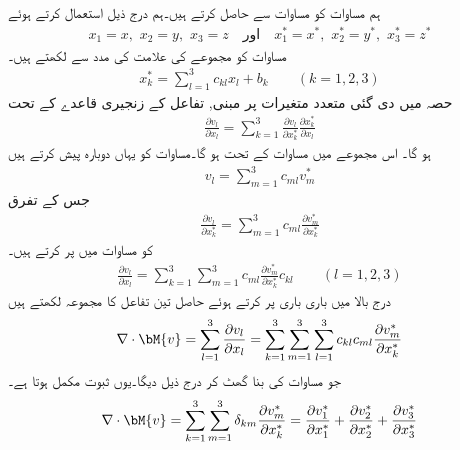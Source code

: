 ہم مساوات  کو مساوات  سے حاصل کرتے ہیں۔ہم درج ذیل استعمال کرتے ہوئے
\begin{align*}
x_1=x,\,\, x_2=y,\,\,x_3=z\quad \text{اور} \quad x_1^*=x^*,\,\,x_2^*=y^*,\,\,x_3^*=z^*
\end{align*}
مساوات  کو مجموعے کی علامت کی مدد سے لکھتے ہیں۔
\begin{align}\label{مساوات_الاحصاء_پھیلاو_عدم_تغیر_الف}
x_k^*=\sum_{l=1}^{3}c_{kl}x_l+b_k\quad \quad (k=1,2,3)
\end{align}
حصہ  میں دی گئی متعدد متغیرات پر مبنی, تفاعل کے  زنجیری قاعدے کے تحت 
\begin{align}\label{مساوات_الاحصاء_پھیلاو_عدم_تغیر_ب}
\frac{\partial v_l}{\partial x_l}=\sum_{k=1}^{3}\frac{\partial v_l}{\partial x_k^*}\frac{\partial x_k^*}{\partial x_l}
\end{align}
ہو گا۔ اس مجموعے میں مساوات  کے تحت  ہو گا۔مساوات  کو یہاں دوبارہ پیش کرتے ہیں
\begin{align*}
v_l=\sum_{m=1}^3 c_{ml} v_m^* 
\end{align*}
جس کے تفرق
\begin{align*}
\frac{\partial v_l}{\partial x_k^*}=\sum_{m=1}^{3} c_{ml} \frac{\partial v_m^*}{\partial x_k^*}
\end{align*}
کو مساوات  میں پر کرتے ہیں۔
\begin{align*}
\frac{\partial v_l}{\partial x_l}=\sum_{k=1}^{3}\sum_{m=1}^{3} c_{ml}\frac{\partial v_m^*}{\partial x_k^*}c_{kl} \quad \quad (l=1,2,3)
\end{align*}
درج بالا میں باری باری   پر کرتے ہوئے حاصل تین تفاعل کا مجموعہ لکھتے ہیں
 \begin{align*}
\nabla \cdot\bM{v}=\sum_{l=1}^{3}\frac{\partial v_l}{\partial x_l}=\sum_{k=1}^{3}\sum_{m=1}^{3}\sum_{l=1}^{3} c_{kl} c_{ml}\frac{\partial v_m^*}{\partial x_k^*}
\end{align*}
جو مساوات  کی بنا گھٹ کر درج ذیل دیگا۔یوں ثبوت مکمل ہوتا ہے۔
\begin{align}
\nabla \cdot \bM{v}=\sum_{k=1}^{3}\sum_{m=1}^{3}\delta_{km} \frac{\partial v_m^*}{\partial x_k^*}=\frac{\partial v_1^*}{\partial x_1^*}
+\frac{\partial v_2^*}{\partial x_2^*}+\frac{\partial v_3^*}{\partial x_3^*}
\end{align}

